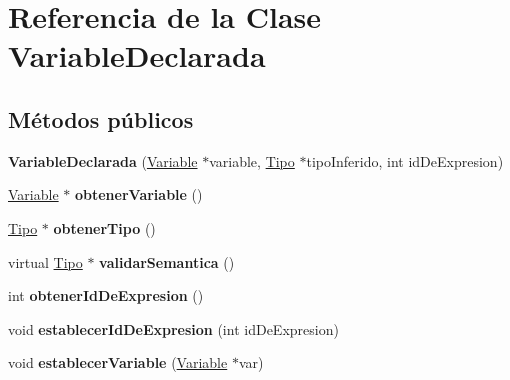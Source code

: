 \hypertarget{class_variable_declarada}{\section{Referencia de la Clase Variable\-Declarada}
\label{class_variable_declarada}
}
\subsection*{Métodos públicos}
\begin{DoxyCompactItemize}
\item 
\hypertarget{class_variable_declarada_a68d3296bb17dec9d3b96da6e3836363d}{{\bfseries Variable\-Declarada} (\hyperlink{class_variable}{Variable} $\ast$variable, \hyperlink{class_tipo}{Tipo} $\ast$tipo\-Inferido, int id\-De\-Expresion)}\label{class_variable_declarada_a68d3296bb17dec9d3b96da6e3836363d}

\item 
\hypertarget{class_variable_declarada_a9d05c48bfd841f3813252bd1af1b6569}{\hyperlink{class_variable}{Variable} $\ast$ {\bfseries obtener\-Variable} ()}\label{class_variable_declarada_a9d05c48bfd841f3813252bd1af1b6569}

\item 
\hypertarget{class_variable_declarada_af6e7894af84b6be85a58ddc702c996b3}{\hyperlink{class_tipo}{Tipo} $\ast$ {\bfseries obtener\-Tipo} ()}\label{class_variable_declarada_af6e7894af84b6be85a58ddc702c996b3}

\item 
\hypertarget{class_variable_declarada_a2d6b63ac58c8814c002b07d4efb40c43}{virtual \hyperlink{class_tipo}{Tipo} $\ast$ {\bfseries validar\-Semantica} ()}\label{class_variable_declarada_a2d6b63ac58c8814c002b07d4efb40c43}

\item 
\hypertarget{class_variable_declarada_af9f5326d742009a7df1ecd75abc8a1c7}{int {\bfseries obtener\-Id\-De\-Expresion} ()}\label{class_variable_declarada_af9f5326d742009a7df1ecd75abc8a1c7}

\item 
\hypertarget{class_variable_declarada_a7ad8b7deab78d657c3fcd903f066b890}{void {\bfseries establecer\-Id\-De\-Expresion} (int id\-De\-Expresion)}\label{class_variable_declarada_a7ad8b7deab78d657c3fcd903f066b890}

\item 
\hypertarget{class_variable_declarada_a5774e99cc18a47162f9b208688402ecd}{void {\bfseries establecer\-Variable} (\hyperlink{class_variable}{Variable} $\ast$var)}\label{class_variable_declarada_a5774e99cc18a47162f9b208688402ecd}


\end{DoxyCompactItemize}
